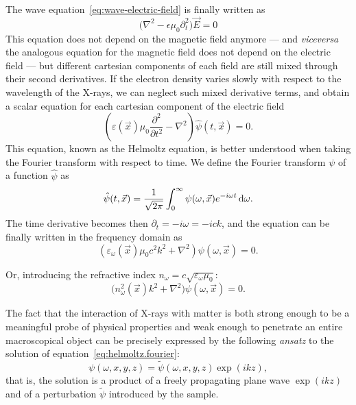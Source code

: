 The wave equation~\eqref{eq:wave-electric-field} is finally written as
\begin{equation}
    \big(\nabla^2 - \epsilon\mu_0\partial^2_t \big) \vec{E} = 0
\end{equation}
This equation does not depend on the magnetic field anymore --- and
\emph{viceversa} the analogous equation for the magnetic field does not
depend on the electric field --- but different cartesian components of each 
field are still mixed through their second derivatives. If the electron density varies slowly
with respect to the wavelength of the X-rays, we can neglect such mixed
derivative terms, and obtain a scalar equation for each cartesian component
of the electric field
\begin{equation}
    \left( \varepsilon(\vec{x}) \mu_0 \frac{\partial^2}{\partial t^2} - \nabla^2
    \right) \hat{\psi}(t, \vec{x}) = 0.\label{eq:helmoltz.spacetime}
\end{equation}
This equation, known as the Helmoltz equation, is better understood when
taking the Fourier transform with respect to time. We define the Fourier
transform $\psi$ of a function $\hat\psi$ as
\begin{equation}
    \hat{\psi}(t, \vec{x}) =
    \frac{1}{\sqrt{2\pi}}\int_{0}^{\infty}\psi(\omega, \vec{x})
    e^{-i \omega t} \operatorname{d}\!{\omega}.
\end{equation}
The time derivative becomes then $\partial_t = - i\omega = -i c k$, and the
equation can be finally written in the frequency domain as
\begin{equation}
    \left( \varepsilon_\omega(\vec{x}) \mu_0 c^2 k^2 + \nabla^2
    \right) \psi(\omega, \vec{x}) = 0.
\end{equation}

Or, introducing the refractive index $n_\omega =
c\sqrt{\varepsilon_\omega\mu_0}$:
\begin{equation}
    \big( n_\omega^2(\vec{x}) k^2 + \nabla^2
    \big) \psi(\omega, \vec{x}) = 0.\label{eq:helmoltz.fourier}
\end{equation}

The fact that the interaction of X-rays with matter is both strong enough to
be a meaningful probe of physical properties and weak enough to penetrate an
entire macroscopical object can be precisely expressed by the following
\emph{ansatz} to the solution of equation~\eqref{eq:helmoltz.fourier}:
    \begin{equation*}
 \psi(\omega, x, y, z) = \tilde{\psi}(\omega, x, y, z) \exp(ikz),    
\end{equation*}
that is, the solution is a product of a freely propagating plane wave
$\exp(ikz)$ and of a perturbation $\tilde{\psi}$ introduced by the sample.

